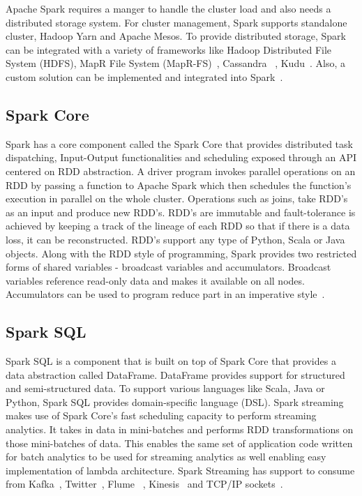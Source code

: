 Apache Spark requires  a manger to handle the cluster load and also needs a 
distributed storage system. For cluster management, Spark supports standalone 
cluster, Hadoop Yarn and Apache Mesos. To provide distributed storage, Spark 
can be integrated with a variety of frameworks like Hadoop Distributed File 
System (HDFS), MapR File System (MapR-FS)~\cite{hid-sp18-408-maprfs}, Cassandra
~\cite{hid-sp18-408-cassandra}, Kudu~\cite{hid-sp18-408-kudu}. Also, a custom 
solution can be implemented and integrated into Spark~\cite{hid-sp18-408-Spark}. 

\subsection{Spark Core}
Spark has a core component called the Spark Core that provides distributed task 
dispatching, Input-Output functionalities and scheduling exposed through an API 
centered on RDD abstraction. A driver program invokes parallel operations on an 
RDD by passing a function to Apache Spark which then schedules the function's 
execution in parallel on the whole cluster. Operations such as joins, take RDD's 
as an input and produce new RDD's. RDD's are immutable and fault-tolerance is 
achieved by keeping a track of the lineage of each RDD so that if there is a 
data loss, it can be reconstructed. RDD's support any type of Python, Scala or 
Java objects. Along with the RDD style of programming, Spark provides two 
restricted forms of shared variables - broadcast variables and accumulators. 
Broadcast variables reference read-only data and makes it available on all 
nodes. Accumulators can be used to program reduce part in an imperative style~\cite{hid-sp18-408-Spark}. 

\subsection{Spark SQL}
Spark SQL is a component that is built on top of Spark Core that provides a data 
abstraction called DataFrame. DataFrame provides support for structured and 
semi-structured data. To support various languages like Scala, Java or Python, 
Spark SQL provides domain-specific language (DSL). Spark streaming makes use of 
Spark Core's fast scheduling capacity to perform streaming analytics. It takes
in data in mini-batches and performs RDD transformations on those mini-batches 
of data. This enables the same set of application code written for batch 
analytics to be used for streaming analytics as well enabling easy 
implementation of lambda architecture. Spark Streaming has support to consume 
from Kafka~\cite{hid-sp18-408-Kafka}, Twitter~\cite{hid-sp18-408-twitter}, Flume
~\cite{hid-sp18-408-flume}, Kinesis~\cite{hid-sp18-408-kinesis} and TCP/IP 
sockets~\cite{hid-sp18-408-Spark}.

